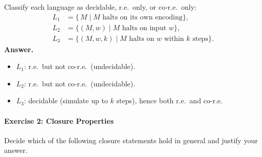 \documentclass{article}
\theoremstyle{theorem}
\theoremstyle{definition}
\theoremstyle{remark}
\begin{document}
Classify each language as decidable, r.e.\ only, or co-r.e.\ only:
\[
\begin{aligned}
L_1 &= \{\,M \mid M\text{ halts on its own encoding}\},\\
L_2 &= \{(M,w)\mid M\text{ halts on input }w\},\\
L_3 &= \{(M,w,k)\mid M\text{ halts on }w\text{ within }k\text{ steps}\}.
\end{aligned}
\]
\textbf{Answer.}
\begin{itemize}
  \item \(L_1\): r.e.\ but not co-r.e.\ (undecidable).
  \item \(L_2\): r.e.\ but not co-r.e.\ (undecidable).
  \item \(L_3\): decidable (simulate up to \(k\) steps), hence both r.e.\ and co-r.e.
\end{itemize}

\paragraph*{Exercise 2: Closure Properties}

Decide which of the following closure statements hold in general and justify your answer.
\end{document}
